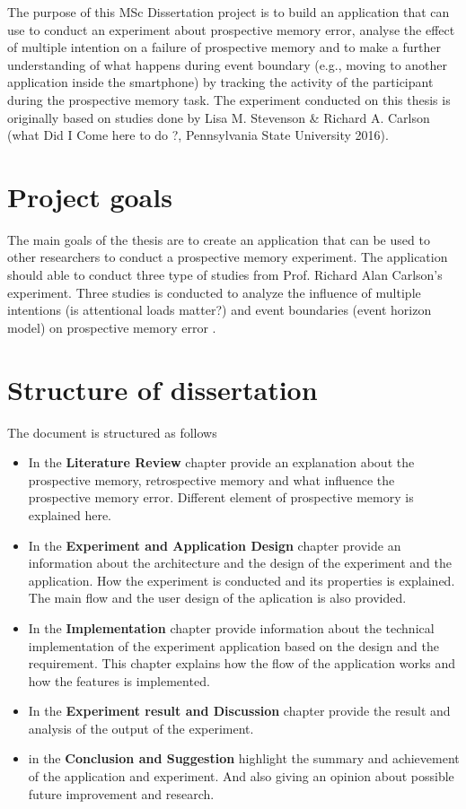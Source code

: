 The purpose of this MSc Dissertation project is to build an application that can use to conduct an experiment about prospective memory error, analyse the effect of multiple intention on a failure of prospective memory and to make a further understanding of what happens
during event boundary (e.g., moving to another application inside the smartphone) by tracking the activity of the participant during the prospective memory task.
The experiment conducted on this thesis is originally based on studies done by Lisa M. Stevenson \&
Richard A. Carlson (what Did I Come here to do ?, Pennsylvania State University 2016).


\section{Project goals}
The main goals of the thesis are to create an application that can be used to other researchers to conduct a prospective memory experiment.
The application should able to conduct three type of studies from Prof. Richard Alan Carlson's experiment.
Three studies is conducted to analyze the influence of multiple intentions (is attentional loads matter?) and event boundaries (event horizon model)
on prospective memory error .

\section{Structure of dissertation}

The document is structured as follows
\begin{itemize}
\item In the \textbf{Literature Review} chapter provide an explanation about the prospective memory, retrospective memory and what influence the prospective memory error.
Different element of prospective memory is explained here.

\item In the \textbf{Experiment and Application Design} chapter provide an information about the architecture and the design of the experiment and the application.
How the experiment is conducted and its properties is explained. The main flow and the user design of the aplication is also provided.

\item In the \textbf{Implementation} chapter provide information about the technical implementation of the experiment application based on the design and the requirement.
 This chapter explains how the flow of the application works and how the features is implemented.

\item In the \textbf{Experiment result and Discussion} chapter provide the result and analysis of the output of the experiment.

\item in the \textbf{Conclusion and Suggestion} highlight the summary and achievement of the application and experiment. And also giving an opinion about possible future improvement and research.


\end{itemize}
